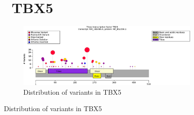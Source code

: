 \begin{figure}[htbp]
\section*{ TBX5}
\centering
\begin{subfigure}[b]{0.95\textwidth}
\centering
\includegraphics[width=\textwidth]{ img/TBX5_protein_diagram.pdf} 
\captionsetup{justification=raggedright,singlelinecheck=false}
\caption{Distribution of variants in TBX5}
\end{subfigure}

\vspace{2em}


\end{figure}
